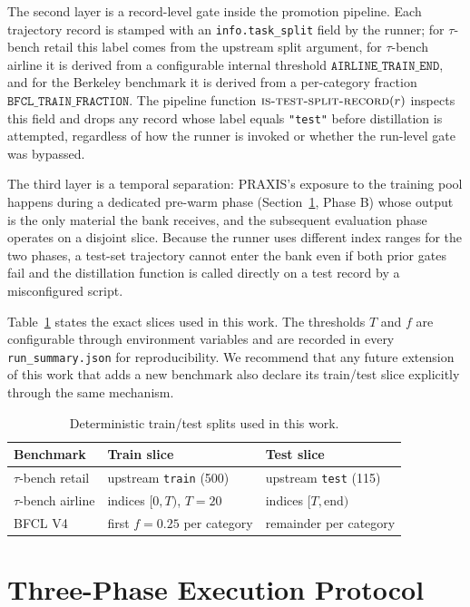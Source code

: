 \documentclass[conference]{IEEEtran}
\begin{document}
The second layer is a record-level gate inside the promotion
pipeline. Each trajectory record is stamped with an
\texttt{info.task\_split} field by the runner; for $\tau$-bench
retail this label comes from the upstream split argument, for
$\tau$-bench airline it is derived from a configurable internal
threshold $\texttt{AIRLINE\_TRAIN\_END}$, and for the Berkeley
benchmark it is derived from a per-category fraction
$\texttt{BFCL\_TRAIN\_FRACTION}$. The pipeline function
$\textsc{is-test-split-record}(r)$ inspects this field and drops
any record whose label equals \texttt{"test"} before distillation
is attempted, regardless of how the runner is invoked or whether
the run-level gate was bypassed.

The third layer is a temporal separation: PRAXIS's exposure to the
training pool happens during a dedicated pre-warm phase
(Section~\ref{sec:phases}, Phase B) whose output is the only
material the bank receives, and the subsequent evaluation phase
operates on a disjoint slice. Because the runner uses different
index ranges for the two phases, a test-set trajectory cannot
enter the bank even if both prior gates fail and the distillation
function is called directly on a test record by a misconfigured
script.

Table~\ref{tab:splits} states the exact slices used in this work.
The thresholds $T$ and $f$ are configurable through environment
variables and are recorded in every \texttt{run\_summary.json} for
reproducibility. We recommend that any future extension of this
work that adds a new benchmark also declare its train/test slice
explicitly through the same mechanism.

\begin{table}[t]
\caption{Deterministic train/test splits used in this work.}
\label{tab:splits}
\centering
\small
\begin{tabular}{@{}lll@{}}
\toprule
\textbf{Benchmark} & \textbf{Train slice} & \textbf{Test slice} \\
\midrule
$\tau$-bench retail  & upstream \texttt{train} (500) & upstream \texttt{test} (115) \\
$\tau$-bench airline & indices $[0, T)$, $T = 20$    & indices $[T, \text{end})$ \\
BFCL V4              & first $f = 0.25$ per category & remainder per category \\
\bottomrule
\end{tabular}
\end{table}

\section{Three-Phase Execution Protocol}\label{sec:phases}
\end{document}
